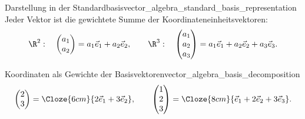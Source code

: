 \begin{KeyPointBox}{Darstellung in der Standardbasis}{vector_algebra_standard_basis_representation}
  Jeder Vektor ist die gewichtete Summe der Koordinateneinheitsvektoren:
  \[
    \R^2:\quad
    \begin{pmatrix}a_1\\a_2\end{pmatrix}
    =a_1\vec e_1+a_2\vec e_2,
    \qquad
    \R^3:\quad
    \begin{pmatrix}a_1\\a_2\\a_3\end{pmatrix}
    =a_1\vec e_1+a_2\vec e_2+a_3\vec e_3.
  \]
\end{KeyPointBox}

\begin{ExampleBox}{Koordinaten als Gewichte der Basisvektoren}{vector_algebra_basis_decomposition}
  \[
    \begin{pmatrix}2\\3\end{pmatrix}
    =\Cloze{6cm}{2\vec e_1+3\vec e_2},
    \qquad
    \begin{pmatrix}1\\2\\3\end{pmatrix}
    =\Cloze{8cm}{\vec e_1+2\vec e_2+3\vec e_3}.
  \]
\end{ExampleBox}
